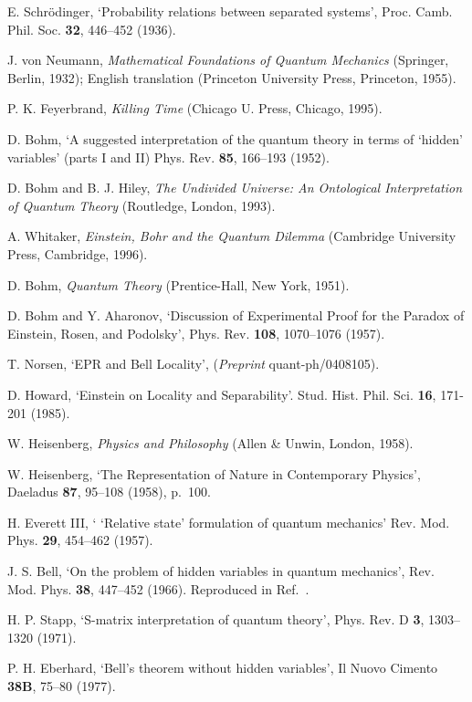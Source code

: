 \documentclass[12pt]{iopart}
\begin{document}
\begin{thebibliography}{10}
E. Schr\"odinger,
 `Probability relations between separated systems',
 Proc. Camb. Phil. Soc. {\bf 32}, 446--452 (1936).
 
J. von Neumann, {\em Mathematical Foundations of Quantum Mechanics}
(Springer, Berlin, 1932);
English translation (Princeton University Press, Princeton, 1955).

P. K. Feyerbrand, {\em Killing Time} (Chicago U. Press, Chicago, 1995). 
 
D. Bohm, `A suggested interpretation of the quantum theory in terms
of `hidden' variables' (parts I and II) Phys. Rev. {\bf 85}, 166--193
(1952).

D. Bohm  and B. J. Hiley, {\em The Undivided Universe: An
Ontological Interpretation of Quantum Theory} (Routledge, London,
1993).

A. Whitaker, {\em Einstein, Bohr and the Quantum Dilemma} (Cambridge
University Press, Cambridge, 1996).

D. Bohm, {\em Quantum Theory} 
(Prentice-Hall, New York, 1951). 

D. Bohm and Y. Aharonov,
`Discussion of Experimental Proof for the Paradox of Einstein, Rosen, and Podolsky',
Phys. Rev. {\bf 108}, 1070--1076 (1957).

T. Norsen, 
`EPR and Bell Locality', ({\em Preprint}  quant-ph/0408105).

D. Howard, `Einstein on Locality and Separability'.
Stud. Hist. Phil. Sci. {\bf 16}, 171-201 (1985).

W. Heisenberg,
{\em Physics and Philosophy}
(Allen \& Unwin, London, 1958).
 
W. Heisenberg, `The Representation of Nature in Contemporary Physics', 
Daeladus {\bf 87}, 95--108 (1958), p.~100. 

H. Everett III, ` `Relative state' formulation of quantum
mechanics' Rev. Mod. Phys. {\bf 29}, 454--462 (1957).
 
J. S. Bell, `On the problem of hidden variables in quantum
mechanics', Rev. Mod. Phys. {\bf 38}, 447--452 (1966). Reproduced
in Ref.~\cite{BellCollection}. 

 H. P. Stapp, `S-matrix interpretation of quantum theory', Phys. Rev. D {\bf 3}, 1303--1320 (1971).

P. H. Eberhard, `Bell's theorem without hidden variables', Il
Nuovo Cimento {\bf 38B}, 75--80 (1977).


\end{thebibliography}
\end{document}
